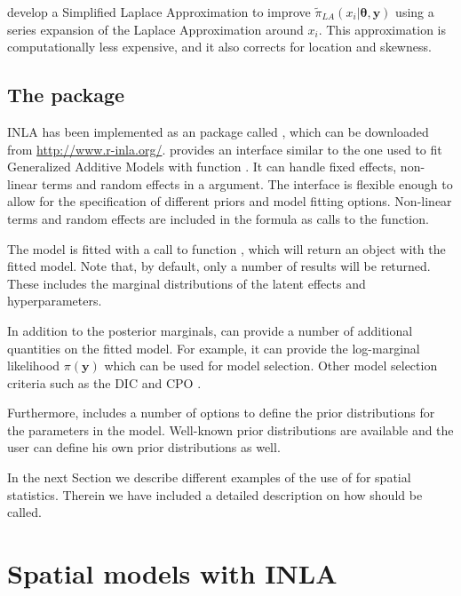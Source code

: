 \documentclass[article]{jss}
\begin{document}
\citet{isi:000264374200002} develop a Simplified Laplace Approximation to
improve $\tilde\pi_{LA}(x_i|\mathbf{\theta}, \mathbf{y})$ using a series
expansion of the Laplace Approximation around $x_i$. This approximation is
computationally less expensive, and it also corrects for location and
skewness.


\subsection[The R-INLA package]{The  package}

INLA has been implemented as an  package called ,
which can be downloaded from \url{http://www.r-inla.org/}. 
provides an interface similar to the one used to fit Generalized Additive
Models with function . It can handle fixed effects, non-linear terms
and random effects in a  argument. The interface is flexible
enough to allow for the specification of different priors and model fitting
options. Non-linear terms and random effects are included in the formula as
calls to the  function. 


The model is fitted with a call to function , which will return an
 object with the fitted model. Note that, by default, only a number
of results will be returned. These includes the marginal distributions of
the latent effects and hyperparameters. 


In addition to the posterior marginals,  can provide a number
of additional quantities on the fitted model. For example, it can 
provide the log-marginal likelihood $\pi(\mathbf{y})$ which can be used
for model selection. Other model selection criteria such as the DIC 
\citep{Spiegelhalteretal:2002} and CPO \citep{Heldetal:2010}.

Furthermore,  includes a number of options to define the
prior distributions for the parameters in the model. Well-known
prior distributions are available and the user can define his own prior
distributions as well.

In the next Section we describe different examples of the use of
 for spatial statistics. Therein we have included
a detailed description on how  should be called.

\section{Spatial models with INLA} \label{sec:spmodels}
\end{document}

